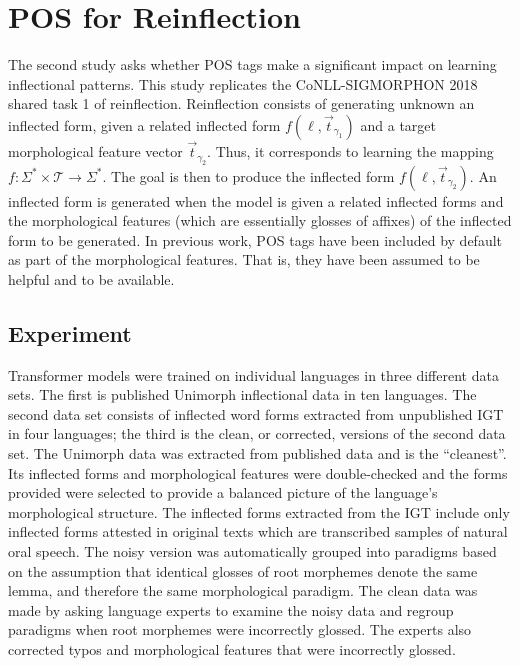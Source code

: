 \section{POS for Reinflection}
\label{sec:posinflection}

The second study asks whether POS tags make a significant impact on learning inflectional patterns. %
This study replicates the CoNLL-SIGMORPHON 2018 shared task 1 of reinflection. Reinflection consists of generating unknown an inflected form, given a related inflected form 
$f(\ell, \vec{t}_{\gamma_1})$ and a target morphological feature vector $\vec{t}_{\gamma_2}$. Thus, it corresponds to learning the mapping $f : \Sigma^* \times \mathcal{T} \to \Sigma^*$. The goal is then to produce the inflected form $f(\ell, \vec{t}_{\gamma_2})$. 
An inflected form is generated when the model is given a related inflected forms and the morphological features (which are essentially glosses of affixes) of the inflected form to be generated. 
In previous work, POS tags have been included by default as part of the morphological features. That is, they have been assumed to be helpful and to be available.


\subsection{Experiment}
\label{sec:inflectionsetup}

Transformer models were trained on individual languages in three different data sets. The first is published Unimorph inflectional data in ten languages. The second data set consists of inflected word forms extracted from unpublished IGT in four languages; the third is the clean, or corrected, versions of the second data set. 
The Unimorph data was extracted from published data and is the ``cleanest''. Its inflected forms and morphological features were double-checked and the forms provided were selected to provide a balanced picture of the language's morphological structure. The inflected forms extracted from the IGT include only inflected forms attested in original texts which are transcribed samples of natural oral speech. The noisy version was automatically grouped into paradigms based on the assumption that identical glosses of root morphemes denote the same lemma, and therefore the same morphological paradigm. The clean data was made by asking language experts to examine the noisy data and regroup paradigms when root morphemes were incorrectly glossed. The experts also corrected typos and morphological features that were incorrectly glossed. 

